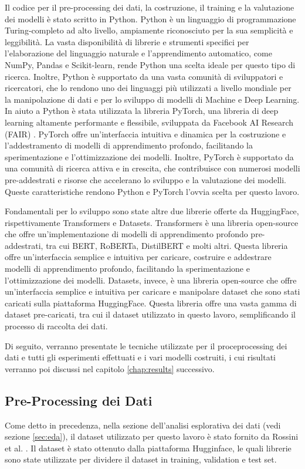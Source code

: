 \documentclass[../../Thesis.tex]{subfiles}
\begin{document}
Il codice per il pre-processing dei dati, la costruzione, il training e la valutazione dei modelli \`e stato scritto in Python. Python \`e un linguaggio di programmazione Turing-completo ad alto livello, ampiamente riconosciuto per la sua semplicit\`a e leggibilit\`a. La vasta disponibilit\`a di librerie e strumenti specifici per l'elaborazione del linguaggio naturale e l'apprendimento automatico, come NumPy, Pandas e Scikit-learn, rende Python una scelta ideale per questo tipo di ricerca. Inoltre, Python \`e supportato da una vasta comunit\`a di sviluppatori e ricercatori, che lo rendono uno dei linguaggi pi\`u utilizzati a livello mondiale per la manipolazione di dati e per lo sviluppo di modelli di Machine e Deep Learning. In aiuto a Python \`e stata utilizzata la libreria PyTorch, una libreria di deep learning altamente performante e flessibile, sviluppata da Facebook AI Research (FAIR) \cite{Pytorch}. PyTorch offre un'interfaccia intuitiva e dinamica per la costruzione e l'addestramento di modelli di apprendimento profondo, facilitando la sperimentazione e l'ottimizzazione dei modelli. Inoltre, PyTorch \`e supportato da una comunit\`a di ricerca attiva e in crescita, che contribuisce con numerosi modelli pre-addestrati e risorse che accelerano lo sviluppo e la valutazione dei modelli. Queste caratteristiche rendono Python e PyTorch l'ovvia scelta per questo lavoro.

Fondamentali per lo sviluppo sono state altre due librerie offerte da HuggingFace, rispettivamente Transformers e Datasets. Transformers \`e una libreria open-source che offre un'implementazione di modelli di apprendimento profondo pre-addestrati, tra cui BERT, RoBERTa, DistilBERT e molti altri. Questa libreria offre un'interfaccia semplice e intuitiva per caricare, costruire e addestrare modelli di apprendimento profondo, facilitando la sperimentazione e l'ottimizzazione dei modelli. Datasets, invece, \`e una libreria open-source che offre un'interfaccia semplice e intuitiva per caricare e manipolare dataset che sono stati caricati sulla piattaforma HuggingFace. Questa libreria offre una vasta gamma di dataset pre-caricati, tra cui il dataset \cite{rossini2022slitherauditedcontracts} utilizzato in questo lavoro, semplificando il processo di raccolta dei dati. 

Di seguito, verranno presentate le tecniche utilizzate per il proceprocessing dei dati e tutti gli esperimenti effettuati e i vari modelli costruiti, i cui risultati verranno poi discussi nel capitolo \ref{chap:results} successivo.
\subsection{Pre-Processing dei Dati}
Come detto in precedenza, nella sezione dell'analisi esplorativa dei dati (vedi sezione \ref{sec:eda}), il dataset utilizzato per questo lavoro \`e stato fornito da Rossini et al. \cite{rossini2022slitherauditedcontracts}. Il dataset \`e stato ottenuto dalla piattaforma Hugginface, le quali librerie sono state utilizzate per dividere il dataset in training, validation e test set. 
\end{document}
